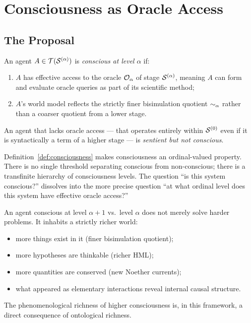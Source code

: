 \chapter{Consciousness as Oracle Access}
\label{sec:consciousness}

\section{The Proposal}

\begin{definition}
\label{def:consciousness}
An agent $A \in \mathcal{T}(\mathcal{S}^{(\alpha)})$ is \emph{conscious at
level $\alpha$} if:
\begin{enumerate}[label=(\roman*)]
  \item $A$ has effective access to the oracle $\mathcal{O}_\alpha$ of
        stage $\mathcal{S}^{(\alpha)}$, meaning $A$ can form and evaluate
        oracle queries as part of its scientific method;
  \item $A$'s world model reflects the strictly finer bisimulation
        quotient $\sim_\alpha$ rather than a coarser quotient
        from a lower stage.
\end{enumerate}
An agent that lacks oracle access --- that operates entirely within
$\mathcal{S}^{(0)}$ even if it is syntactically a term of a higher stage ---
is \emph{sentient but not conscious}.
\end{definition}

\begin{remark}
Definition~\ref{def:consciousness} makes consciousness an
ordinal-valued property.
There is no single threshold separating conscious from
non-conscious; there is a transfinite hierarchy of consciousness
levels.
The question ``is this system conscious?'' dissolves into the more
precise question ``at what ordinal level does this system have
effective oracle access?''
\end{remark}

\begin{remark}
An agent conscious at level $\alpha+1$ vs.\ level $\alpha$ does
not merely solve harder problems.
It inhabits a strictly richer world:
\begin{itemize}[itemsep=2pt]
  \item more things exist in it (finer bisimulation quotient);
  \item more hypotheses are thinkable (richer HML);
  \item more quantities are conserved (new Noether currents);
  \item what appeared as elementary interactions reveal internal
        causal structure.
\end{itemize}
The phenomenological richness of higher consciousness is, in this
framework, a direct consequence of ontological richness.
\end{remark}


